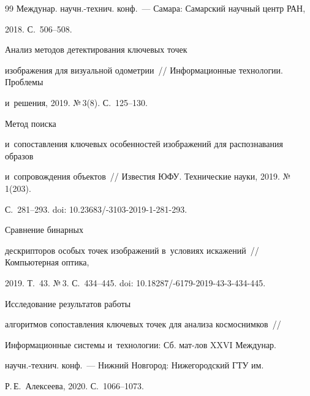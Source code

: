 {{\begin{thebibliography}{99}
Междунар. на\-учн.-тех\-нич. конф.~--- Самара: Самарский научный центр РАН, 


2018. С.~506--508.


  




   Анализ методов детектирования ключевых точек 


изображения для визуальной одо\-мет\-рии~/\!\!/ Информационные технологии. Проблемы 


и~решения, 2019. №\,3(8). С.~125--130.




   Метод поиска 


и~со\-по\-став\-ле\-ния ключевых особенностей изображений для распознавания образов 


и~со\-про\-вож\-де\-ния объектов~/\!\!/ Известия ЮФУ. Технические науки, 2019. №\,1(203). 


С.~281--293. doi: 10.23683\!/-3103-2019-1-281-293.







   Сравнение бинарных 


дескрипторов особых точек изображений в~условиях искажений~/\!\!/ Компьютерная оптика, 


2019. Т.~43. №\,3. С.~434--445. doi: 10.18287\!/-6179-2019-43-3-434-445.







   Исследование результатов работы 


алгоритмов со\-по\-став\-ле\-ния ключевых точек для анализа космоснимков~/\!\!/ 


Информационные сис\-те\-мы и~технологии: Сб. мат-лов XXVI Междунар. 


  на\-учн.-тех\-нич. конф.~--- Нижний Новгород: Нижегородский ГТУ им.\ 


Р.\,Е.~Алексеева, 2020. С.~1066--1073.


  


  





\end{thebibliography}}}
